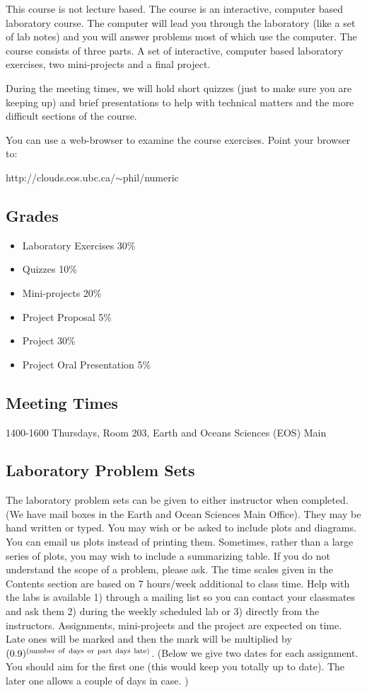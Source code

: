 \documentclass[10pt]{article}
\begin{document}
This course is not lecture based. The course is an interactive, computer based laboratory course. The computer will lead you through the laboratory (like a set of lab notes) and you will answer problems most of which use the computer. The course consists of three parts. A set of  interactive, computer based
laboratory exercises, two mini-projects and a final project.

During the meeting times, we will hold short quizzes (just to make sure you are keeping up) and brief presentations to help with technical matters and the more difficult sections of the course.

You can use a web-browser to examine the
course exercises. Point your browser to: 

http://clouds.eos.ubc.ca/$\sim$phil/numeric


\subsection*{Grades}

\begin{itemize}
\item       Laboratory Exercises 30\% 
\item	    Quizzes 10\%
\item 	    Mini-projects 20\%
\item       Project Proposal 5\%
\item       Project 30\% 
\item	    Project Oral Presentation 5\%
\end{itemize}

\subsection*{Meeting Times}

1400-1600 Thursdays, Room 203, Earth and Oceans Sciences (EOS) Main


\subsection*{Laboratory Problem Sets}

The laboratory problem sets can be given to either instructor when completed.
(We have mail boxes in the Earth and Ocean Sciences Main Office).
They may be hand written or typed.  You may wish or be asked to include
plots and diagrams.  You can email us plots instead of printing them.
Sometimes, rather than a large series of plots, you
may wish to include a summarizing table.  If you do not
understand the scope of a problem, please ask.  The time scales given
in the Contents section are based on 7 hours/week additional to class time.  
Help with the labs
is available 1) through a mailing list so you can contact your classmates
and ask them 2) during the weekly scheduled lab or 3) directly from the
instructors.  Assignments, mini-projects and the project are expected on
time.  Late ones will be marked and then the mark will be multiplied by
$(0.9)^{\rm (number\ of\ days\ or\ part\ days\ late)}$.
(Below we give two dates
for each assignment.  You should aim for the first one (this would keep you
totally up to date).  The later one allows a couple of days in case.
)
\end{document}
